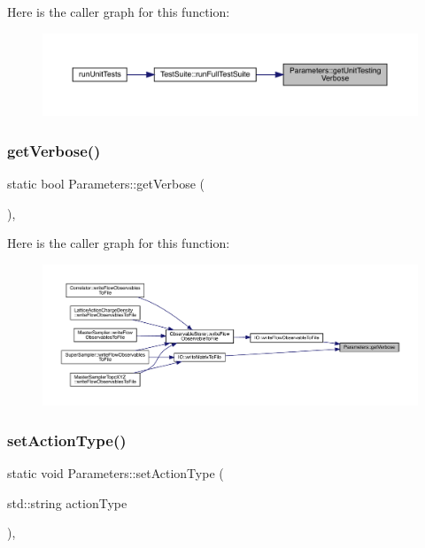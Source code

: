 Here is the caller graph for this function\+:\nopagebreak
\begin{figure}[H]
\begin{center}
\leavevmode
\includegraphics[width=350pt]{class_parameters_a2645617063e170828a3da439094ab626_icgraph}
\end{center}
\end{figure}
\mbox{\label{class_parameters_a07453f20719f54f9fd6f72d311638b39}} 
\subsubsection{\texorpdfstring{getVerbose()}{getVerbose()}}
{\footnotesize\ttfamily static bool Parameters\+::get\+Verbose (\begin{DoxyParamCaption}{ }\end{DoxyParamCaption})\hspace{0.3cm}{\ttfamily [inline]}, {\ttfamily [static]}}

Here is the caller graph for this function\+:\nopagebreak
\begin{figure}[H]
\begin{center}
\leavevmode
\includegraphics[width=350pt]{class_parameters_a07453f20719f54f9fd6f72d311638b39_icgraph}
\end{center}
\end{figure}
\mbox{\label{class_parameters_aa7436b658d07358009b922584798fb6d}} 
\subsubsection{\texorpdfstring{setActionType()}{setActionType()}}
{\footnotesize\ttfamily static void Parameters\+::set\+Action\+Type (\begin{DoxyParamCaption}\item[{std\+::string}]{action\+Type }\end{DoxyParamCaption})\hspace{0.3cm}{\ttfamily [inline]}, {\ttfamily [static]}}

